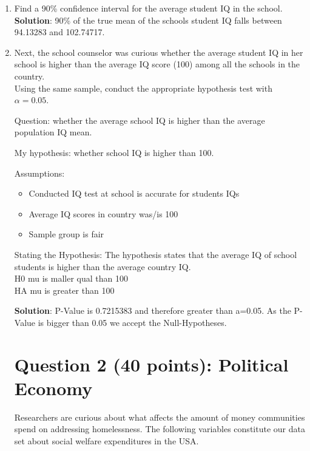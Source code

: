 \documentclass[12pt,letterpaper]{article}
\begin{document}
\begin{enumerate}
	\item Find a 90\% confidence interval for the average student IQ in the school.\\

\textbf{Solution}: 90\% of the true mean of the schools student IQ falls between 94.13283 and 102.74717.	
	
	  
	
	\item Next, the school counselor was curious  whether  the average student IQ in her school is higher than the average IQ score (100) among all the schools in the country.\\ 
	
	\noindent Using the same sample, conduct the appropriate hypothesis test with $\alpha=0.05$.
	 
Question: whether the average school IQ is higher than the average population IQ mean. 

My hypothesis: whether school IQ is higher than 100. 

Assumptions:
\begin{itemize}
\item Conducted IQ test at school is accurate for students IQs
\item Average IQ scores in country was/is 100
\item Sample group is fair
\end{itemize}

Stating the Hypothesis: The hypothesis states that the average IQ of school students is higher than the average country IQ.\\
H0 mu is maller qual than  100 \\
HA mu is greater than 100

		  

\textbf{Solution}: P-Value is 0.7215383 and therefore greater than a=0.05. As the P-Value is bigger than 0.05 we accept the Null-Hypotheses.

\newpage

	\section*{Question 2 (40 points): Political Economy}

\noindent Researchers are curious about what affects the amount of money communities spend on addressing homelessness. The following variables constitute our data set about social welfare expenditures in the USA. \\
\vspace{.5cm}



\end{enumerate}
\end{document}
